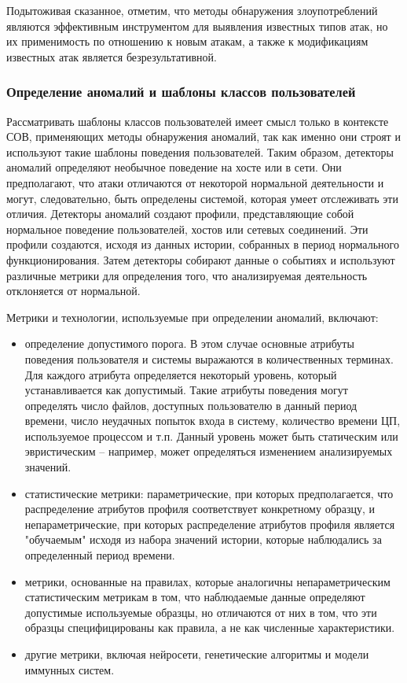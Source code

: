 Подытоживая сказанное, отметим, что методы обнаружения злоупотреблений являются эффективным инструментом для выявления известных типов атак, но их применимость по отношению к новым атакам,
а также к модификациям известных атак является безрезультативной.


\subsubsection{Определение аномалий и шаблоны классов пользователей}

Рассматривать шаблоны классов пользователей имеет смысл только в контексте СОВ,
применяющих методы обнаружения аномалий, так как именно они строят и используют
такие шаблоны поведения пользователей. Таким образом, детекторы аномалий определяют
необычное поведение на хосте или в сети. Они предполагают, что атаки отличаются от
некоторой нормальной деятельности и могут, следовательно, быть определены системой,
которая умеет отслеживать эти отличия. Детекторы аномалий создают профили, представляющие
собой нормальное поведение пользователей, хостов или сетевых соединений. Эти профили
создаются, исходя из данных истории, собранных в период нормального функционирования.
Затем детекторы собирают данные о событиях и используют различные метрики для определения
того, что анализируемая деятельность отклоняется от нормальной.

Метрики и технологии, используемые при определении аномалий, включают:

\begin{itemize}
	\item определение допустимого порога. В этом случае основные атрибуты поведения
	пользователя и системы выражаются в количественных терминах. Для каждого атрибута
	определяется некоторый уровень, который устанавливается как допустимый. Такие атрибуты
	поведения могут определять число файлов, доступных пользователю в данный период времени,
	число неудачных попыток входа в систему, количество времени ЦП, используемое процессом и
	т.п. Данный уровень может быть статическим или эвристическим -- например, может определяться
	изменением анализируемых значений.

	\item статистические метрики: параметрические, при которых предполагается, что распределение
	атрибутов профиля соответствует конкретному образцу, и непараметрические, при которых
	распределение атрибутов профиля является "обучаемым" исходя из набора значений истории,
	которые наблюдались за определенный период времени.

	\item метрики, основанные на правилах, которые аналогичны непараметрическим статистическим
	метрикам в том, что наблюдаемые данные определяют допустимые используемые образцы, но
	отличаются от них в том, что эти образцы специфицированы как правила, а не как численные
	характеристики.

	\item другие метрики, включая нейросети, генетические алгоритмы и модели иммунных систем.
\end{itemize}


